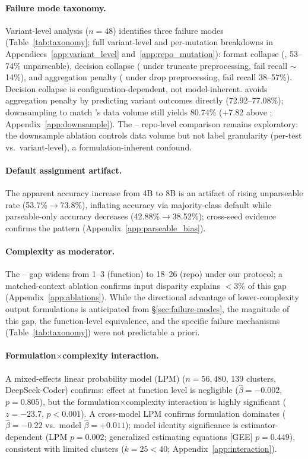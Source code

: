 \paragraph{Failure mode taxonomy.} Variant-level analysis ($n{=}48$) identifies three failure modes (Table~\ref{tab:taxonomy}; full variant-level and per-mutation breakdowns in Appendices~\ref{app:variant_level} and~\ref{app:repo_mutation}): format collapse (\cwm{}, 53--74\% unparseable), decision collapse (\cls{} under truncate preprocessing, fail recall ${\sim}$14\%), and aggregation penalty (\cls{} under drop preprocessing, fail recall 38--57\%). Decision collapse is configuration-dependent, not model-inherent. \traj{} avoids aggregation penalty by predicting variant outcomes directly (72.92--77.08\%); downsampling \cls{} to match \traj{}'s data volume still yields 80.74\% (+7.82\pp{} above \traj{}; Appendix~\ref{app:downsample}). The \cls{}--\traj{} repo-level comparison remains exploratory: the downsample ablation controls data volume but not label granularity (per-test vs.\ variant-level), a formulation-inherent confound.

\paragraph{Default assignment artifact.} The apparent \cwm{} accuracy increase from 4B to 8B is an artifact of rising unparseable rate (53.7\%$\to$73.8\%), inflating accuracy via majority-class default while parseable-only accuracy decreases (42.88\%$\to$38.52\%); cross-seed evidence confirms the pattern (Appendix~\ref{app:parseable_bias}).

\paragraph{Complexity as moderator.} The \cls{}--\cwm{} gap widens from 1--3\pp{} (function) to 18--26\pp{} (repo) under our protocol; a matched-context ablation confirms input disparity explains $<$3\% of this gap (Appendix~\ref{app:ablations}). While the directional advantage of lower-complexity output formulations is anticipated from \S\ref{sec:failure-modes}, the magnitude of this gap, the function-level equivalence, and the specific failure mechanisms (Table~\ref{tab:taxonomy}) were not predictable a priori.

\paragraph{Formulation$\times$complexity interaction.} A mixed-effects linear probability model (LPM) ($n{=}56{,}480$, 139 clusters, DeepSeek-Coder) confirms: \cwm{} effect at function level is negligible ($\hat{\beta}{=}-0.002$, $p{=}0.805$), but the formulation$\times$complexity interaction is highly significant ($z{=}-23.7$, $p{<}0.001$). A cross-model LPM confirms formulation dominates ($\hat{\beta}{=}-0.22$ vs.\ model $\hat{\beta}{=}+0.011$); model identity significance is estimator-dependent (LPM $p{=}0.002$; generalized estimating equations [GEE] $p{=}0.449$), consistent with limited clusters ($k{=}25 < 40$; Appendix~\ref{app:interaction}).

